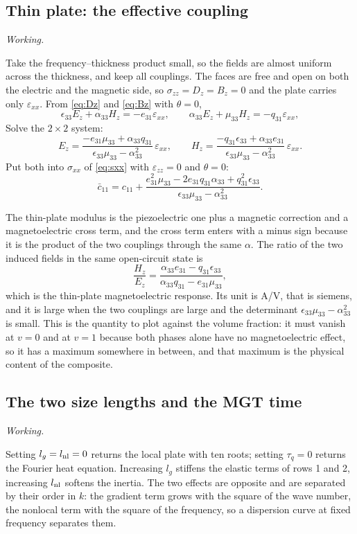 \documentclass[11pt,a4paper]{article}
\newif\ifshowworked \showworkedtrue
\newenvironment{worked}{\ifshowworked\par\smallskip\noindent\textit{Working.}\par\else\setbox0\vbox\bgroup\fi}{\ifshowworked\par\smallskip\else\egroup\fi}
\newcommand{\eps}{\varepsilon}
\newcommand{\aME}{\alpha}
\begin{document}
\subsection{Thin plate: the effective coupling}

\begin{worked}
Take the frequency--thickness product small, so the fields are almost uniform across the thickness, and keep
all couplings. The faces are free and open on both the electric and the magnetic side, so
$\sigma_{zz}=D_z=B_z=0$ and the plate carries only $\eps_{xx}$. From \eqref{eq:Dz} and \eqref{eq:Bz} with
$\theta=0$,
\[
\epsilon_{33}E_z+\aME_{33}H_z=-e_{31}\eps_{xx},\qquad
\aME_{33}E_z+\mu_{33}H_z=-q_{31}\eps_{xx},
\]
Solve the $2\times2$ system:
\[
E_z=\frac{-e_{31}\mu_{33}+\aME_{33}q_{31}}{\epsilon_{33}\mu_{33}-\aME_{33}^2}\,\eps_{xx},\qquad
H_z=\frac{-q_{31}\epsilon_{33}+\aME_{33}e_{31}}{\epsilon_{33}\mu_{33}-\aME_{33}^2}\,\eps_{xx}.
\]
Put both into $\sigma_{xx}$ of \eqref{eq:sxx} with $\eps_{zz}=0$ and $\theta=0$:
\[
\bar c_{11}=c_{11}+\frac{e_{31}^2\mu_{33}-2e_{31}q_{31}\aME_{33}+q_{31}^2\epsilon_{33}}
{\epsilon_{33}\mu_{33}-\aME_{33}^2}.
\]
\end{worked}

\noindent The thin-plate modulus is the piezoelectric one plus a magnetic correction and a magnetoelectric
cross term, and the cross term enters with a minus sign because it is the product of the two couplings
through the same $\aME$. The ratio of the two induced fields in the same open-circuit state is
\begin{equation}\label{eq:ratio}
\frac{H_z}{E_z}=\frac{\aME_{33}e_{31}-q_{31}\epsilon_{33}}{\aME_{33}q_{31}-e_{31}\mu_{33}},
\end{equation}
which is the thin-plate magnetoelectric response. Its unit is A/V, that is siemens, and it is large when the
two couplings are large and the determinant $\epsilon_{33}\mu_{33}-\aME_{33}^2$ is small. This is the
quantity to plot against the volume fraction: it must vanish at $v=0$ and at $v=1$ because both phases alone
have no magnetoelectric effect, so it has a maximum somewhere in between, and that maximum is the physical
content of the composite.

\subsection{The two size lengths and the MGT time}

\begin{worked}
Setting $l_g=l_{\rm nl}=0$ returns the local plate with ten roots; setting $\tau_q=0$ returns the Fourier
heat equation. Increasing $l_g$ stiffens the elastic terms of rows 1 and 2, increasing $l_{\rm nl}$ softens
the inertia. The two effects are opposite and are separated by their order in $k$: the gradient term grows
with the square of the wave number, the nonlocal term with the square of the frequency, so a dispersion curve
at fixed frequency separates them.
\end{worked}
\end{document}
